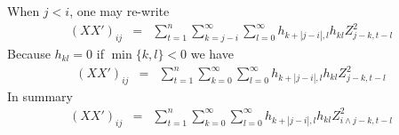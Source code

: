\documentclass{article}
\begin{document}
When $j < i$, one may re-write
\begin{eqnarray*}
  (XX')_{ij} &=& \sum_{t=1}^n \sum_{k=j-i}^\infty \sum_{l=0}^\infty
  h_{k+|j-i|,l} h_{kl} Z_{j-k, t-l}^2
\end{eqnarray*}
Because $h_{kl} = 0$ if $\min\{k,l\} < 0$ we have
\begin{eqnarray*}
  (XX')_{ij} &=& \sum_{t=1}^n \sum_{k=0}^\infty \sum_{l=0}^\infty
  h_{k+|j-i|,l} h_{kl} Z_{j-k, t-l}^2
\end{eqnarray*}
In summary
\begin{eqnarray*}
  (XX')_{ij} &=& \sum_{t=1}^n \sum_{k=0}^\infty \sum_{l=0}^\infty
  h_{k+|j-i|,l} h_{kl} Z_{i \wedge j -k, t-l}^2
\end{eqnarray*}



\end{document}
